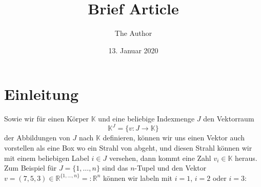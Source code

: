 \documentclass[11pt]{article} %
\title{Brief Article}
\author{The Author}
\date{13. Januar 2020} %
\renewcommand{\_}{\rule{0.2cm}{.5pt}}
\begin{document}
\maketitle

\section{Einleitung}

\begin{changemargin}{0pt}{0pt}
Sowie wir für einen Körper $\mathbb{K}$ und eine beliebige Indexmenge $J$ den Vektorraum
\begin{equation}
\mathbb{K}^{J} = \{v: J \longrightarrow \mathbb{K} \}
\end{equation}
der Abbildungen von $J$ nach $\mathbb{K}$ definieren, können wir uns einen Vektor auch vorstellen als
eine Box wo ein Strahl von abgeht, und diesen Strahl können wir mit einem beliebigen Label $i \in J$ versehen, dann
kommt eine Zahl $v_{i} \in \mathbb{K}$ heraus.\\
Zum Beispiel für $J = \{1,\dots,n\}$ sind das $n$-Tupel und den Vektor $v = (7,5,3) \in \mathbb{R}^{\{1,\dots,n\}} =: \mathbb{R}^n$
können wir labeln mit $i = 1$, $i = 2$ oder $i = 3$:
\end{changemargin}
\end{document}
